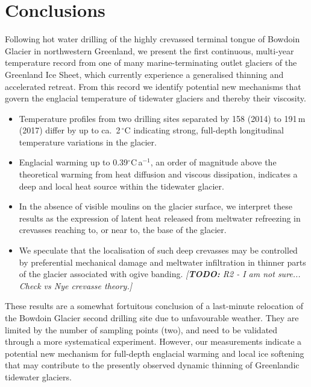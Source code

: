 \documentclass[utf8]{article}
\newcommand{\todo}[1]{\textcolor{c3}{\emph{[\textbf{TODO:} #1]}}}
\begin{document}
\section{Conclusions}

    Following hot water drilling of the highly crevassed terminal tongue of
    Bowdoin Glacier in northwestern Greenland, we present the first continuous,
    multi-year temperature record from one of many marine-terminating outlet
    glaciers of the Greenland Ice Sheet, which currently experience a
    generalised thinning and accelerated retreat. From this record we identify
    potential new mechanisms that govern the englacial temperature of tidewater
    glaciers and thereby their viscosity.

    \begin{itemize}

      \item Temperature profiles from two drilling sites separated by 158
        (2014) to 191\,m (2017) differ by up to ca.~2\,$^\circ$C indicating
        strong, full-depth longitudinal temperature variations in the glacier.

      \item Englacial warming up to 0.39$^\circ$C\,a$^{-1}$, an order of
        magnitude above the theoretical warming from heat diffusion and viscous
        dissipation, indicates a deep and local heat source within the
        tidewater glacier.

      \item In the absence of visible moulins on the glacier surface, we interpret
        these results as the expression of latent heat released from meltwater
        refreezing in crevasses reaching to, or near to, the base of the glacier.

      \item We speculate that the localisation of such deep crevasses may be
        controlled by preferential mechanical damage and meltwater infiltration
        in thinner parts of the glacier associated with ogive banding.
        \todo{R2 - I am not sure... Check vs Nye crevasse theory.}

    \end{itemize}

    These results are a somewhat fortuitous conclusion of a last-minute relocation
    of the Bowdoin Glacier second drilling site due to unfavourable weather.
    They are limited by the number of sampling points (two), and need to
    be validated through a more systematical experiment. However, our
    measurements indicate
    a potential new mechanism for full-depth englacial warming and local
    ice softening that may contribute to the presently observed dynamic
    thinning of Greenlandic tidewater glaciers.
\end{document}

